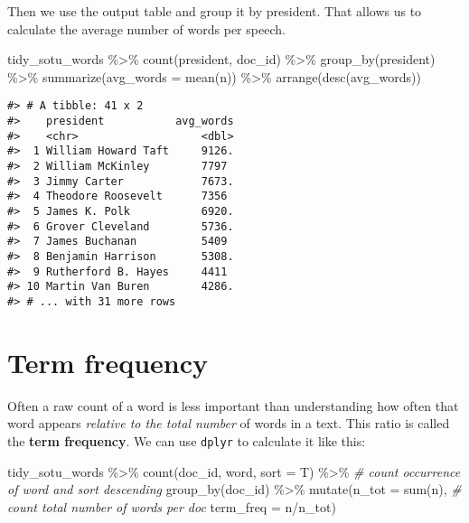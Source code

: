\documentclass[
]{book}
\newenvironment{Shaded}{\begin{snugshade}}{\end{snugshade}}
\newcommand{\AttributeTok}[1]{\textcolor[rgb]{0.77,0.63,0.00}{#1}}
\newcommand{\CommentTok}[1]{\textcolor[rgb]{0.56,0.35,0.01}{\textit{#1}}}
\newcommand{\FunctionTok}[1]{\textcolor[rgb]{0.00,0.00,0.00}{#1}}
\newcommand{\NormalTok}[1]{#1}
\newcommand{\SpecialCharTok}[1]{\textcolor[rgb]{0.00,0.00,0.00}{#1}}
\begin{document}
Then we use the output table and group it by president. That allows us to calculate the average number of words per speech.

\begin{Shaded}
\begin{Highlighting}[]
\NormalTok{tidy\_sotu\_words }\SpecialCharTok{\%\textgreater{}\%}
  \FunctionTok{count}\NormalTok{(president, doc\_id)  }\SpecialCharTok{\%\textgreater{}\%} 
  \FunctionTok{group\_by}\NormalTok{(president) }\SpecialCharTok{\%\textgreater{}\%} 
  \FunctionTok{summarize}\NormalTok{(}\AttributeTok{avg\_words =} \FunctionTok{mean}\NormalTok{(n)) }\SpecialCharTok{\%\textgreater{}\%} 
  \FunctionTok{arrange}\NormalTok{(}\FunctionTok{desc}\NormalTok{(avg\_words))}
\end{Highlighting}
\end{Shaded}

\begin{verbatim}
#> # A tibble: 41 x 2
#>    president           avg_words
#>    <chr>                   <dbl>
#>  1 William Howard Taft     9126.
#>  2 William McKinley        7797 
#>  3 Jimmy Carter            7673.
#>  4 Theodore Roosevelt      7356 
#>  5 James K. Polk           6920.
#>  6 Grover Cleveland        5736.
#>  7 James Buchanan          5409 
#>  8 Benjamin Harrison       5308.
#>  9 Rutherford B. Hayes     4411 
#> 10 Martin Van Buren        4286.
#> # ... with 31 more rows
\end{verbatim}

\hypertarget{term-frequency}{%
\section{Term frequency}\label{term-frequency}}

Often a raw count of a word is less important than understanding how often that word appears \emph{relative to the total number} of words in a text. This ratio is called the \textbf{term frequency}. We can use \texttt{dplyr} to calculate it like this:

\begin{Shaded}
\begin{Highlighting}[]
\NormalTok{tidy\_sotu\_words }\SpecialCharTok{\%\textgreater{}\%}
  \FunctionTok{count}\NormalTok{(doc\_id, word, }\AttributeTok{sort =}\NormalTok{ T)  }\SpecialCharTok{\%\textgreater{}\%}  \CommentTok{\# count occurrence of word and sort descending}
  \FunctionTok{group\_by}\NormalTok{(doc\_id) }\SpecialCharTok{\%\textgreater{}\%} 
  \FunctionTok{mutate}\NormalTok{(}\AttributeTok{n\_tot =} \FunctionTok{sum}\NormalTok{(n),              }\CommentTok{\# count total number of words per doc}
         \AttributeTok{term\_freq =}\NormalTok{ n}\SpecialCharTok{/}\NormalTok{n\_tot)}
\end{Highlighting}
\end{Shaded}
\end{document}
